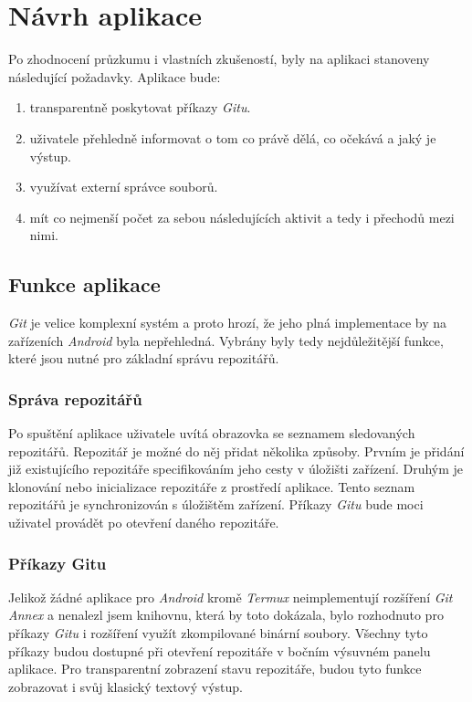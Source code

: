 \chapter{Návrh aplikace}
Po zhodnocení průzkumu i vlastních zkušeností, byly na aplikaci stanoveny následující požadavky. Aplikace bude:
\begin{enumerate}
    \item transparentně poskytovat příkazy \emph{Gitu}.
    \item uživatele přehledně informovat o tom co právě dělá, co očekává a jaký je výstup.
    \item využívat externí správce souborů.
    \item mít co nejmenší počet za sebou následujících aktivit a tedy i přechodů mezi nimi.
\end{enumerate}

\section{Funkce aplikace}
\emph{Git} je velice komplexní systém a proto hrozí, že jeho plná implementace by na zařízeních \emph{Android} byla nepřehledná. Vybrány byly tedy nejdůležitější funkce, které jsou nutné pro základní správu repozitářů.

    \subsection{Správa repozitářů}
    Po spuštění aplikace uživatele uvítá obrazovka se seznamem sledovaných repozitářů. Repozitář je možné do něj přidat několika způsoby. Prvním je přidání již existujícího repozitáře specifikováním jeho cesty v úložišti zařízení. Druhým je klonování nebo inicializace repozitáře z prostředí aplikace. Tento seznam repozitářů je synchronizován s úložištěm zařízení. Příkazy \emph{Gitu} bude moci uživatel provádět po otevření daného repozitáře.

    \newpage
    \subsection{Příkazy Gitu}
    Jelikož žádné aplikace pro \emph{Android} kromě \emph{Termux} neimplementují rozšíření \emph{Git Annex} a nenalezl jsem knihovnu, která by toto dokázala, bylo rozhodnuto pro příkazy \emph{Gitu} i rozšíření využít zkompilované binární soubory. Všechny tyto příkazy budou dostupné při otevření repozitáře v bočním výsuvném panelu aplikace. Pro transparentní zobrazení stavu repozitáře, budou tyto funkce zobrazovat i svůj klasický textový výstup.

